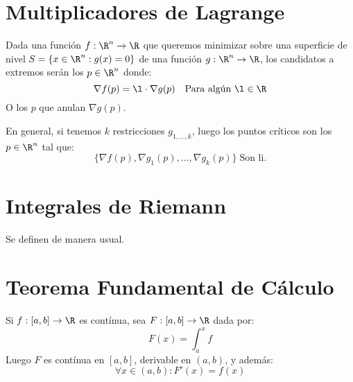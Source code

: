 \documentclass{article}
\begin{document}
    \section*{Multiplicadores de Lagrange}
    \begin{teo}
        Dada una función $f : \R^n \to \R$ que queremos minimizar sobre una superficie de nivel $S = \{x \in \R^n : g(x) = 0\}$ de una función $g : \R^n \to \R$, los candidatos a extremos serán los $p \in \R^n$ donde:
        \[
            \nabla f(p) = \l \cdot \nabla g(p) \quad \text{Para algún $\l \in \R$}
        \]
        O los $p$ que anulan $\nabla g(p)$.

        En general, si tenemos $k$ restricciones $g_{1, \dots, k}$, luego los puntos críticos son los $p \in \R^n$ tal que:
        \[
            \{\nabla f(p), \nabla g_1(p), \dots, \nabla g_k(p) \} \; \text{Son li.}
        \]
    \end{teo}
    \section*{Integrales de Riemann}
    Se definen de manera usual.
    \section*{Teorema Fundamental de Cálculo}
    \begin{teo}
        Si $f : [a, b] \to \R$ es contínua, sea $F : [a, b] \to \R$ dada por:
        \[F(x) = \int_a^x f\]
        Luego $F$ es contínua en $[a,b]$, derivable en $(a,b)$, y además:
        \[\forall x \in (a,b) : F'(x) = f(x)\]
    \end{teo}
\end{document}

